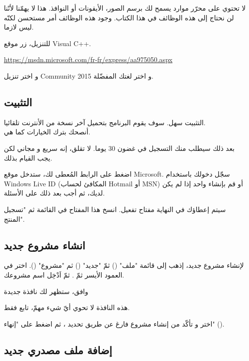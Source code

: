 لا تحتوي على محرّر موارد يسمح لك برسم الصور، الأيقونات أو النوافذ. هذا لا يهمّنا لأنّنا لن نحتاج إلى هذه الوظائف في هذا الكتاب. وجود هذه الوظائف أمر مستحسن لكنّه ليس لازما.

للتنزيل، زر موقع
\textenglish{Visual C++}.

\url{https://msdn.microsoft.com/fr-fr/express/aa975050.aspx}

و اختر تنزيل
\textenglish{Community 2015}
و اختر لغتك المفضّلة.

\subsection{التثبيت}

التثبيت سهل. سوف يقوم البرنامج بتحميل آخر نسخة من الأنترنت تلقائيا.\\
أنصحك بترك الخيارات كما هي.

بعد ذلك سيطلب منك التسجيل في غضون 30 يوما. لا تقلق، إنه سريع و مجاني لكن يجب القيام بذلك.

اضغط على الرابط المُعطى لك، ستدخل موقع
\textenglish{Microsoft}.
سجّل دخولك باستخدام
\textenglish{Windows Live ID}
(المكافئ لحساب
\textenglish{Hotmail}
أو
\textenglish{MSN})
أو قم بإنشاء واحد إذا لم يكن لديك، ثم أجب بعد ذلك على الأسئلة.

سيتم إعطاؤك في النهاية مفتاح تفعيل. انسخ هذا المفتاح في القائمة
ثم
"تسجيل المنتج".

\subsection{انشاء مشروع جديد}

لإنشاء مشروع جديد، إذهب إلى قائمة
"ملف"
()
ثمّ
"جديد"
()
ثم
"مشروع"
().
اختر
في العمود الأيسر ثمّ
.
ثمّ اَدْخِل اسم مشروعك.


وافق، ستظهر لك نافذة جديدة


هذه النافذة لا تحوي أيّ شيء مهمّ، تابع فقط.


اختر
و تأكّد من إنشاء مشروع فارغ عن طريق تحديد
،
ثم اضغط على
"إنهاء"
().

\subsection{إضافة ملف مصدري جديد}

